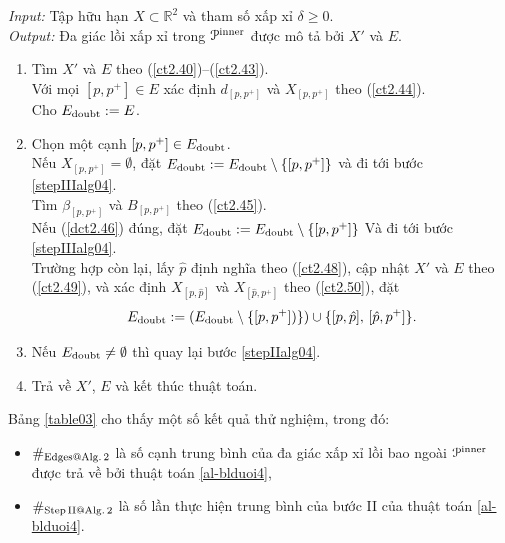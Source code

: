 \documentclass[12pt,a4paper,openany,oneside]{report}
\def\R{\mathbb{R}}
\begin{document}
\begin{algorithm}\label{alg04}  \rm 
	\caption{}  \label{al-blduoi4}
	\emph{Input:} Tập hữu hạn $X \subset \R^2$ và tham số xấp xỉ $\delta \geq 0$. \\
	\emph{Output:} Đa giác lồi xấp xỉ trong ${\cal P}^{\rm inner}$ được mô tả bởi $X'$ và $E$.
	\begin{enumerate}
		\item\label{stepIalg04} 
		Tìm $X'$ và $E$ theo (\ref{ct2.40})--(\ref{ct2.43}).\\
		Với mọi ${[p, p^+]} \in E$ xác định $d_{[p, p^+]}$ và $X_{[p, p^+]}$ theo (\ref{ct2.44}).\\
		Cho $E_{\rm doubt} := E$.
		
		\item\label{stepIIalg04} 
		 Chọn một cạnh $[p, p^+] \in E_{\rm doubt}$. \\
		Nếu $X_{[p, p^+]} = \emptyset$, đặt
		$E_{\rm doubt} := E_{\rm doubt} \setminus \{[p, p^+]\}$
		và đi tới bước \ref{stepIIIalg04}.\\
		Tìm $\beta_{[p, p^+]}$ và $B_{[p, p^+]}$ theo (\ref{ct2.45}). \\
		Nếu (\ref{dct2.46}) đúng, đặt
		$E_{\rm doubt} := E_{\rm doubt} \setminus \{[p, p^+]\}$
		Và đi tới bước \ref{stepIIIalg04}.\\
		Trường hợp còn lại, lấy $\hat p$ định nghĩa theo (\ref{ct2.48}),
		 cập nhật $X'$ và $E$ theo (\ref{ct2.49}), và xác định $X_{[p, \hat p]}$ và $X_{[\hat p, p^+]}$ theo (\ref{ct2.50}), đặt
		\begin{equation*}%
			E_{\rm doubt} := (E_{\rm doubt} \setminus \{[p, p^+])\}) \cup \{[p, \hat p], \, [\hat p, p^+]\}.
		\end{equation*}
		
		\item\label{stepIIIalg04} 
		Nếu $E_{\rm doubt} \ne \emptyset$  thì quay lại bước \ref{stepIIalg04}.
		
		\item
		Trả về $X'$, $E$ và kết thúc thuật toán.
	\end{enumerate}
\end{algorithm}


\medskip
Bảng \ref{table03} cho thấy một số kết quả thử nghiệm, trong đó:
\begin{itemize}
	\item $\#_{\rm Edges@ Alg.\, 2}$  là số cạnh trung bình của đa giác xấp xỉ lồi bao ngoài ${\cal P}^{\rm inner}$ được trả về bởi thuật toán \ref{al-blduoi4},
	\item $\#_{\rm Step\, II @ Alg.\, 2}$ là số lần thực hiện trung bình của bước II của thuật toán \ref{al-blduoi4}.
\end{itemize}
\end{document}
